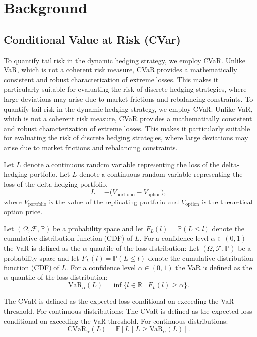 \documentclass{article}
\begin{document}
\section{Background}
\subsection{ Conditional Value at Risk (CVar)}

To quantify tail risk in the dynamic hedging strategy, we employ CVaR. Unlike VaR, which is not a coherent risk measure, CVaR provides a mathematically consistent and robust characterization of extreme losses. This makes it particularly suitable for evaluating the risk of discrete hedging strategies, where large deviations may arise due to market frictions and rebalancing constraints.
To quantify tail risk in the dynamic hedging strategy, we employ CVaR. Unlike VaR, which is not a coherent risk measure, CVaR provides a mathematically consistent and robust characterization of extreme losses. This makes it particularly suitable for evaluating the risk of discrete hedging strategies, where large deviations may arise due to market frictions and rebalancing constraints.

Let $L$ denote a continuous random variable representing the loss of the delta-hedging portfolio. 
Let $L$ denote a continuous random variable representing the loss of the delta-hedging portfolio. 
\[
L = - \big( V_{\text{portfolio}} - V_{\text{option}} \big),
\]
where $V_{\text{portfolio}}$ is the value of the replicating portfolio and $V_{\text{option}}$ is the theoretical option price.

Let $(\Omega, \mathcal{F}, \mathbb{P})$ be a probability space and let $F_L(l) = \mathbb{P}(L \leq l)$ denote the cumulative distribution function (CDF) of $L$. For a confidence level $\alpha \in (0,1)$ the VaR is defined as the $\alpha$-quantile of the loss distribution:
Let $(\Omega, \mathcal{F}, \mathbb{P})$ be a probability space and let $F_L(l) = \mathbb{P}(L \leq l)$ denote the cumulative distribution function (CDF) of $L$. For a confidence level $\alpha \in (0,1)$ the VaR is defined as the $\alpha$-quantile of the loss distribution:
\[
\text{VaR}_\alpha(L) = \inf \{ l \in \mathbb{R} \mid F_L(l) \geq \alpha \}.
\]

The CVaR is defined as the expected loss conditional on exceeding the VaR threshold. For continuous distributions:
The CVaR is defined as the expected loss conditional on exceeding the VaR threshold. For continuous distributions:
\[
\text{CVaR}_\alpha(L) = \mathbb{E} \left[ L \mid L \geq \text{VaR}_\alpha(L) \right].
\]
\end{document}
